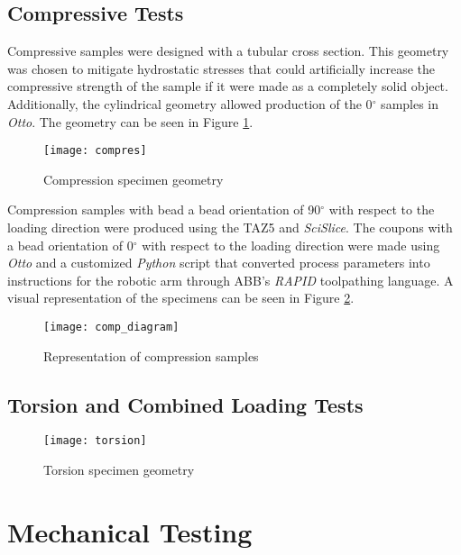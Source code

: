 \documentclass[main.tex]{subfiles}
\begin{document}
\subsection{Compressive Tests}

Compressive samples were designed with a tubular cross section. This geometry was chosen to mitigate hydrostatic stresses that could artificially increase the compressive strength of the sample if it were made as a completely solid object. Additionally, the cylindrical geometry allowed production of the 0$^\circ$ samples in \emph{Otto}. The geometry can be seen in Figure \ref{fig:comp}.
\begin{figure}[h]
	\center
	\texttt{[image: compres]}
	\caption{Compression specimen geometry} \label{fig:comp}
\end{figure}

Compression samples with bead a bead orientation of 90$^\circ$ with respect to the loading direction were produced using the TAZ5 and \emph{SciSlice}. The coupons with a bead orientation of 0$^\circ$ with respect to the loading direction were made using \emph{Otto} and a customized \emph{Python} script that converted process parameters into instructions for the robotic arm through ABB's \emph{RAPID} toolpathing language. A visual representation of the specimens can be seen in Figure \ref{fig:comp_d}. 
\begin{figure}[h]
	\center
	\texttt{[image: comp\_diagram]}
	\caption{Representation of compression samples} \label{fig:comp_d}
\end{figure}

\subsection{Torsion and Combined Loading Tests}
\begin{figure}[h]
	\center
	\texttt{[image: torsion]}
	\caption{Torsion specimen geometry} \label{fig:tors}
\end{figure}

\section{Mechanical Testing}
% 

\end{document}
